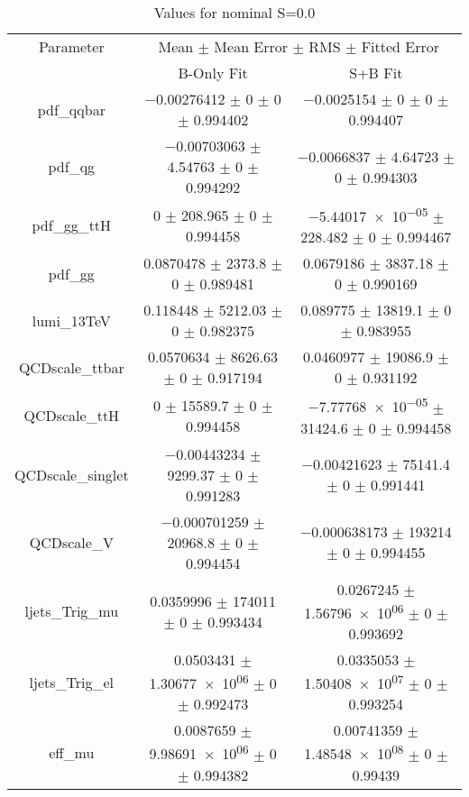 \begin{table}
\centering
\caption{Values for nominal S=0.0}
\begin{tabular}{ccc}
\toprule
Parameter & \multicolumn{2}{c}{Mean $\pm$ Mean Error $\pm$ RMS $\pm$ Fitted Error}\\
 & B-Only Fit & S+B Fit\\
\midrule
pdf\_qqbar & \num{-0.00276412} $\pm$ \num{0} $\pm$ \num{0} $\pm$ \num{0.994402} & \num{-0.0025154} $\pm$ \num{0} $\pm$ \num{0} $\pm$ \num{0.994407}\\
pdf\_qg & \num{-0.00703063} $\pm$ \num{4.54763} $\pm$ \num{0} $\pm$ \num{0.994292} & \num{-0.0066837} $\pm$ \num{4.64723} $\pm$ \num{0} $\pm$ \num{0.994303}\\
pdf\_gg\_ttH & \num{0} $\pm$ \num{208.965} $\pm$ \num{0} $\pm$ \num{0.994458} & \num{-5.44017e-05} $\pm$ \num{228.482} $\pm$ \num{0} $\pm$ \num{0.994467}\\
pdf\_gg & \num{0.0870478} $\pm$ \num{2373.8} $\pm$ \num{0} $\pm$ \num{0.989481} & \num{0.0679186} $\pm$ \num{3837.18} $\pm$ \num{0} $\pm$ \num{0.990169}\\
lumi\_13TeV & \num{0.118448} $\pm$ \num{5212.03} $\pm$ \num{0} $\pm$ \num{0.982375} & \num{0.089775} $\pm$ \num{13819.1} $\pm$ \num{0} $\pm$ \num{0.983955}\\
QCDscale\_ttbar & \num{0.0570634} $\pm$ \num{8626.63} $\pm$ \num{0} $\pm$ \num{0.917194} & \num{0.0460977} $\pm$ \num{19086.9} $\pm$ \num{0} $\pm$ \num{0.931192}\\
QCDscale\_ttH & \num{0} $\pm$ \num{15589.7} $\pm$ \num{0} $\pm$ \num{0.994458} & \num{-7.77768e-05} $\pm$ \num{31424.6} $\pm$ \num{0} $\pm$ \num{0.994458}\\
QCDscale\_singlet & \num{-0.00443234} $\pm$ \num{9299.37} $\pm$ \num{0} $\pm$ \num{0.991283} & \num{-0.00421623} $\pm$ \num{75141.4} $\pm$ \num{0} $\pm$ \num{0.991441}\\
QCDscale\_V & \num{-0.000701259} $\pm$ \num{20968.8} $\pm$ \num{0} $\pm$ \num{0.994454} & \num{-0.000638173} $\pm$ \num{193214} $\pm$ \num{0} $\pm$ \num{0.994455}\\
ljets\_Trig\_mu & \num{0.0359996} $\pm$ \num{174011} $\pm$ \num{0} $\pm$ \num{0.993434} & \num{0.0267245} $\pm$ \num{1.56796e+06} $\pm$ \num{0} $\pm$ \num{0.993692}\\
ljets\_Trig\_el & \num{0.0503431} $\pm$ \num{1.30677e+06} $\pm$ \num{0} $\pm$ \num{0.992473} & \num{0.0335053} $\pm$ \num{1.50408e+07} $\pm$ \num{0} $\pm$ \num{0.993254}\\
eff\_mu & \num{0.0087659} $\pm$ \num{9.98691e+06} $\pm$ \num{0} $\pm$ \num{0.994382} & \num{0.00741359} $\pm$ \num{1.48548e+08} $\pm$ \num{0} $\pm$ \num{0.99439}\\

\end{tabular}
\end{table}
